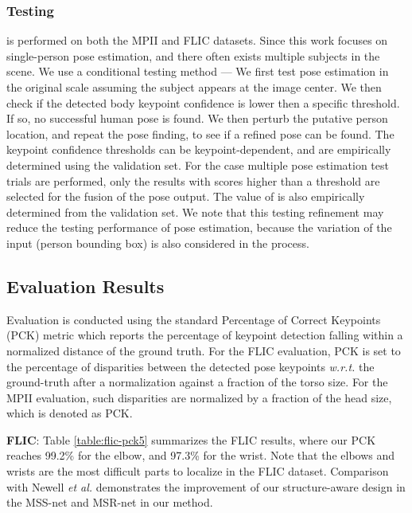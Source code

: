 \documentclass[runningheads]{llncs}
\begin{document}
\subsubsection{Testing}
is performed on both the MPII and FLIC datasets. Since this work focuses on single-person pose estimation, and there often exists multiple subjects in the scene.
We use a conditional testing method --- 
We first test pose estimation in the original scale assuming the subject appears at the image center.
We then check if the detected body keypoint confidence is lower then a specific threshold.
If so, no successful human pose is found.
We then perturb the putative person location, and repeat the pose finding, to see if a refined pose can be found. 
The keypoint confidence thresholds  can be keypoint-dependent, and are empirically determined using the validation set. 
For the case multiple pose estimation test trials are performed, only the results with scores higher than a threshold  are selected for the fusion of the pose output. The value of  is also empirically determined from the validation set.
We note that this testing refinement may reduce the testing performance of pose estimation, because the variation of the input (person bounding box) is also considered in the process.





\subsection{Evaluation Results}
\label{sec:eval:accuracy}


Evaluation is conducted using the standard Percentage of Correct Keypoints (PCK) metric \cite{tompson2015efficient} which reports the percentage of keypoint detection falling within a normalized distance of the ground truth. For the FLIC evaluation, PCK is set to the percentage of disparities between the detected pose keypoints {\em w.r.t.} the ground-truth after a normalization against a fraction of the torso size. For the MPII evaluation, such disparities are normalized by a fraction of the head size, which is denoted as PCK.

{\bf FLIC}: Table \ref{table:flic-pck5} summarizes the FLIC results, where our PCK reaches 99.2\% for the elbow, and 97.3\% for the wrist. 
Note that the elbows and wrists are the most difficult parts to localize in the FLIC dataset. Comparison with Newell {\em et al.} \cite{newell2016stacked} demonstrates the improvement of our structure-aware design in the MSS-net and MSR-net in our method.
\end{document}
